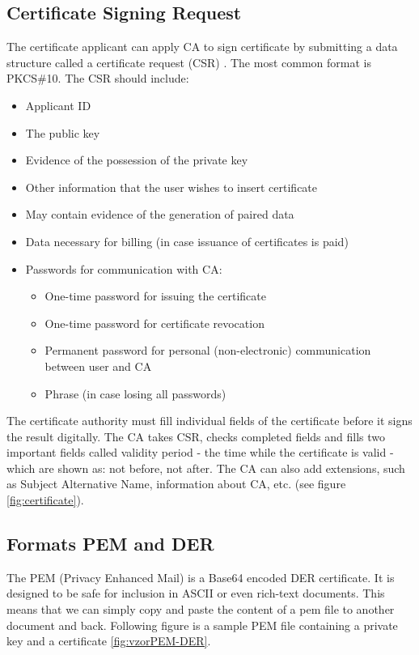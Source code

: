 \documentclass[
  digital, %
  notable,   %
  lof,     %
  lot,     %
]{fithesis3}
\begin{document}
\subsection{Certificate Signing Request}
The certificate applicant can apply CA to sign certificate by submitting a data structure called a 
certificate request (CSR) \cite{dostalek2016velky}. The most common format is PKCS\#10. The CSR 
should include:
\begin{itemize}[leftmargin=2em,rightmargin=1em,itemsep=0.75\parskip,parsep=0em,topsep=0em,partopsep=0em]
\item Applicant ID
\item The public key
\item Evidence of the possession of the private key
\item Other information that the user wishes to insert certificate
\item May contain evidence of the generation of paired data
\item Data necessary for billing (in case issuance of certificates is paid)
\item Passwords for communication with CA:
  \begin{itemize}[leftmargin=2em,rightmargin=1em,itemsep=0.75\parskip,parsep=0em,topsep=0em,partopsep=0em]
  \item One-time password for issuing the certificate
  \item One-time password for certificate revocation
  \item Permanent password for personal (non-electronic) communication between user and CA
  \item Phrase (in case losing all passwords) 
  \end{itemize}
\end{itemize} 

The certificate authority must fill individual fields of the certificate before it signs the 
result digitally. The CA takes CSR, checks completed fields and fills two important fields called validity period - the time while the certificate is valid - which are shown as: not before, not after. The CA can also add extensions, such as Subject Alternative Name, information 
about CA, etc. (see figure \ref{fig:certificate}).

\subsection{Formats PEM and DER}
The PEM (Privacy Enhanced Mail) is a Base64 encoded DER certificate. It is designed 
to be safe for inclusion in ASCII or even rich-text documents. This means that we can simply copy 
and paste the content of a pem file to another document and back. Following figure is a sample 
PEM file containing a private key and a certificate \ref{fig:vzorPEM-DER}.
\end{document}
